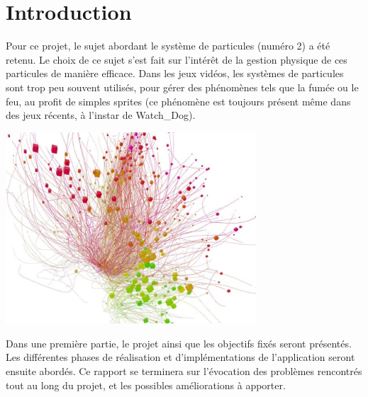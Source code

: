 \chapter*{Introduction}

Pour ce projet, le sujet abordant le système de particules (numéro 2) a été
retenu. Le choix de ce sujet s'est fait sur l'intérêt de la gestion physique de
ces particules de manière efficace. Dans les jeux vidéos, les systèmes de
particules sont trop peu souvent utilisés, pour gérer des phénomènes tels que la
fumée ou le feu, au profit de simples sprites (ce phénomène est toujours présent
même dans des jeux récents, à l'instar de Watch\_Dog).\\

\begin{center}
	\includegraphics[width=0.7\textwidth]{img/01-introduction.jpg} 
\end{center}

Dans une première partie, le projet ainsi que les objectifs fixés seront
présentés. Les différentes phases de réalisation et d'implémentations de
l'application seront ensuite abordés. Ce rapport se terminera sur l'évocation
des problèmes rencontrés tout au long du projet, et les possibles améliorations
à apporter.

